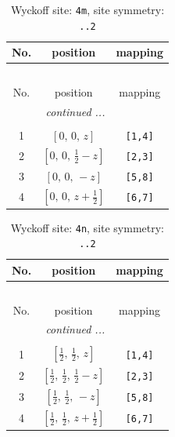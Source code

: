 \documentclass[fleqn,8pt]{jsarticle}
\begin{document}
\renewcommand{\arraystretch}{1.2}
\begin{longtable}{ccc}
\caption{Wyckoff site: {\tt 4m}, site symmetry: {\tt ..2}}
 \\
 \hline \hline
No. & position & mapping \\ \hline \endfirsthead

\multicolumn{2}{l}{\tablename\ \thetable{}} \\
 \hline \hline
No. & position & mapping \\ \hline \endhead

 \hline \hline
\multicolumn{2}{r}{\footnotesize\it continued ...} \\ \endfoot

 \hline \hline
\multicolumn{2}{r}{} \\ \endlastfoot

1 & $\left[ 0,\, 0,\, z \right]$ & {\tt [1,4]} \\ \hline
2 & $\left[ 0,\, 0,\, \frac{1}{2} - z \right]$ & {\tt [2,3]} \\ \hline
3 & $\left[ 0,\, 0,\, - z \right]$ & {\tt [5,8]} \\ \hline
4 & $\left[ 0,\, 0,\, z + \frac{1}{2} \right]$ & {\tt [6,7]} \\
\end{longtable}
\renewcommand{\arraystretch}{1.2}
\begin{longtable}{ccc}
\caption{Wyckoff site: {\tt 4n}, site symmetry: {\tt ..2}}
 \\
 \hline \hline
No. & position & mapping \\ \hline \endfirsthead

\multicolumn{2}{l}{\tablename\ \thetable{}} \\
 \hline \hline
No. & position & mapping \\ \hline \endhead

 \hline \hline
\multicolumn{2}{r}{\footnotesize\it continued ...} \\ \endfoot

 \hline \hline
\multicolumn{2}{r}{} \\ \endlastfoot

1 & $\left[ \frac{1}{2},\, \frac{1}{2},\, z \right]$ & {\tt [1,4]} \\ \hline
2 & $\left[ \frac{1}{2},\, \frac{1}{2},\, \frac{1}{2} - z \right]$ & {\tt [2,3]} \\ \hline
3 & $\left[ \frac{1}{2},\, \frac{1}{2},\, - z \right]$ & {\tt [5,8]} \\ \hline
4 & $\left[ \frac{1}{2},\, \frac{1}{2},\, z + \frac{1}{2} \right]$ & {\tt [6,7]} \\
\end{longtable}
\end{document}
